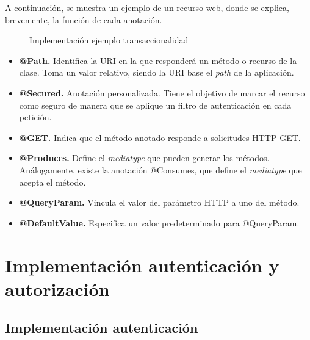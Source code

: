 A continuación, se muestra un ejemplo de un recurso web, donde se explica, brevemente, la función de cada anotación.


\begin{figure}[H]
\centering
{}
\caption{Implementación ejemplo transaccionalidad}
\end{figure}

\begin{itemize}
	\item \textbf{@Path. }Identifica la URI en la que responderá un método o recurso de la clase. Toma un valor relativo, siendo la URI base el \textit{path} de la aplicación.
	\item \textbf{@Secured. }Anotación personalizada. Tiene el objetivo de marcar el recurso como seguro de manera que se aplique un filtro de autenticación en cada petición.
	\item \textbf{@GET. }Indica que el método anotado responde a solicitudes HTTP GET.
	\item \textbf{@Produces. }Define el \textit{mediatype} que pueden generar los métodos. Análogamente, existe la anotación @Consumes, que define el \textit{mediatype} que acepta el método.
	\item \textbf{@QueryParam. }Vincula el valor del parámetro HTTP a uno del método.
	\item \textbf{@DefaultValue. }Especifica un valor predeterminado para @QueryParam.
\end{itemize}


\section{Implementación autenticación y autorización}

\subsection{Implementación autenticación}


